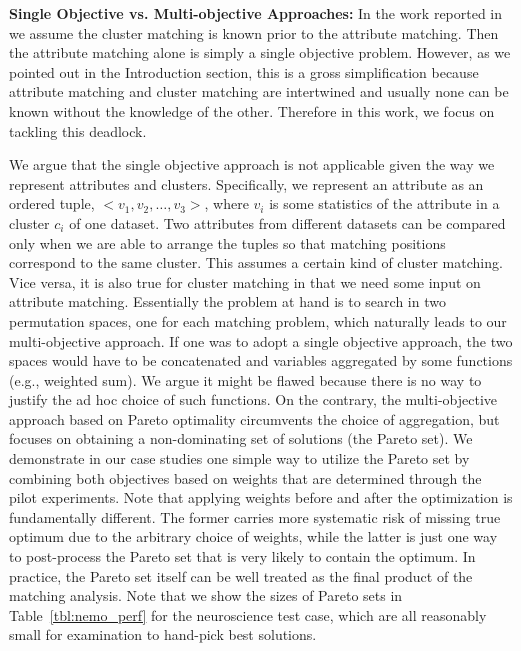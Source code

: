 \textbf{Single Objective vs. Multi-objective Approaches:}
In the work reported in~\cite{LiuEtal10,LiuEtalNEUCOM12} we assume the cluster matching is known prior to the attribute matching. Then the attribute matching alone is simply a single objective problem. However, as we pointed out in the Introduction section, this is a gross simplification because attribute matching and cluster matching are intertwined and usually none can be known without the knowledge of the other. Therefore in this work, we focus on tackling this deadlock.

We argue that the single objective approach is not applicable given the way we represent attributes and clusters. Specifically, we represent an attribute as an ordered tuple, $<v_1, v_2, \ldots, v_3>$, where $v_i$ is some statistics of the attribute in a cluster $c_i$ of one dataset. Two attributes from different datasets can be compared only when we are able to arrange the tuples so that matching positions correspond to the same cluster. This assumes a certain kind of cluster matching. Vice versa, it is also true for cluster matching in that we need some input on attribute matching. Essentially the problem at hand is to search in two permutation spaces, one for each matching problem, which naturally leads to our multi-objective approach. If one was to adopt a single objective approach, the two spaces would have to be concatenated and variables aggregated by some functions (e.g., weighted sum).  We argue it might be flawed because there is no way to justify the ad hoc choice of such functions. On the contrary, the multi-objective approach based on Pareto optimality circumvents the choice of aggregation, but focuses on obtaining a non-dominating set of solutions (the Pareto set). We demonstrate in our case studies one simple way to utilize the Pareto set by combining both objectives based on weights that are determined through the pilot experiments. Note that applying weights before and after the optimization is fundamentally different. The former carries more systematic risk of missing true optimum due to the arbitrary choice of weights, while the latter is just one way to post-process the Pareto set that is very likely to contain the optimum. In practice, the Pareto set itself can be well treated as the final product of the matching analysis. Note that we show the sizes of Pareto sets in Table~\ref{tbl:nemo_perf} for the neuroscience test case, which are all reasonably small for examination to hand-pick best solutions.
 